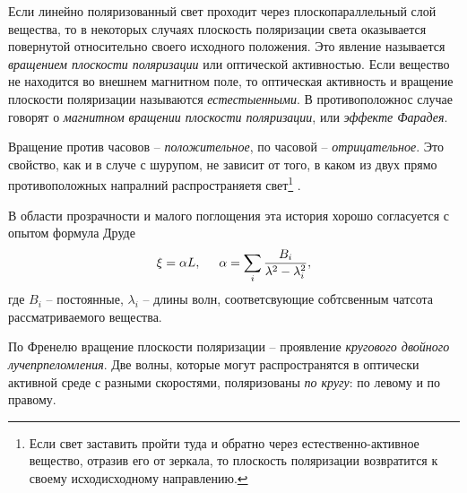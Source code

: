 
Если линейно поляризованный свет проходит через плоскопараллельный слой вещества, то в некоторых случаях плоскость поляризации света оказывается повернутой относительно своего исходного положения. Это явление называется \textit{вращением плоскости поляризации} или оптической активностью. Если вещество не находится во внешнем магнитном поле, то оптическая активность и вращение плоскости поляризации называются \textit{естестыенными}. В противоположнос случае говорят о \textit{магнитном вращении плоскости поляризации}, или \textit{эффекте Фарадея}. 


Вращение против часовов -- \textit{положительное}, по часовой -- \textit{отрицательное}. Это свойство, как и в случе с шурупом, не зависит от того, в каком из двух прямо противоположных напралний распространяетя свет\footnote{
    Если свет заставить пройти туда и обратно через естественно-активное вещество, отразив его от
    зеркала, то плоскость поляризации возвратится к своему исходисходному направлению.
} . 


В области прозрачности и малого поглощения эта история хорошо согласуется с опытом формула Друде
\begin{equation*}
    \xi = \alpha L,
    \hspace{5 mm} 
    \alpha = \sum_i \frac{B_i}{\lambda^2-\lambda_i^2},
\end{equation*}
где $B_i$ -- постоянные, $\lambda_i$ -- длины волн, соответсвующие собтсвенным чатсота рассматриваемого вещества. 



По Френелю вращение плоскости поляризации -- проявление \textit{кругового двойного лучепрпеломления}. Две волны, которые могут распространятся в оптически активной среде с разными скоростями, поляризованы \textit{по кругу}: по левому и по правому.

